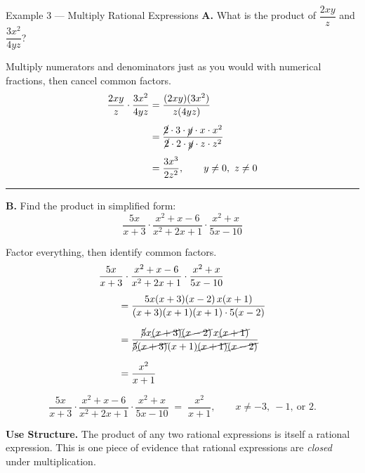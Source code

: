 \documentclass[11pt]{article}
\begin{document}
\begin{example}{Example 3 --- Multiply Rational Expressions}
\textbf{A.} What is the product of $\dfrac{2xy}{z}$ and $\dfrac{3x^{2}}{4yz}$?

\vspace{0.4em}
Multiply numerators and denominators just as you would with numerical fractions, then cancel common factors.
\begin{align*}
\dfrac{2xy}{z}\cdot \dfrac{3x^{2}}{4yz} &= \dfrac{(2xy)(3x^{2})}{z(4yz)} \\[4pt]
&= \dfrac{\cancel{2}\cdot 3 \cdot \cancel{y}\cdot x \cdot x^{2}}{\cancel{2}\cdot 2 \cdot \cancel{y}\cdot z \cdot z^{2}} \\[4pt]
&= \dfrac{3x^{3}}{2z^{2}}, \qquad y \neq 0,\ z \neq 0
\end{align*}

\vspace{0.5em}
\hrule
\vspace{0.5em}

\textbf{B.} Find the product in simplified form:
\[
\dfrac{5x}{x+3}\cdot \dfrac{x^{2}+x-6}{x^{2}+2x+1}\cdot \dfrac{x^{2}+x}{5x-10}
\]

\vspace{0.3em}
Factor everything, then identify common factors.
\begin{align*}
&\dfrac{5x}{x+3}\cdot \dfrac{x^{2}+x-6}{x^{2}+2x+1}\cdot \dfrac{x^{2}+x}{5x-10} \\[4pt]
&\qquad = \dfrac{5x(x+3)(x-2)\,x(x+1)}{(x+3)(x+1)(x+1)\cdot 5(x-2)} \\[6pt]
&\qquad = \dfrac{\cancel{5}x\cancel{(x+3)}\cancel{(x-2)}\,x\cancel{(x+1)}}{\cancel{5}\cancel{(x+3)}(x+1)\cancel{(x+1)}\cancel{(x-2)}} \\[6pt]
&\qquad = \dfrac{x^{2}}{x+1}
\end{align*}

\[
\dfrac{5x}{x+3}\cdot \dfrac{x^{2}+x-6}{x^{2}+2x+1}\cdot \dfrac{x^{2}+x}{5x-10} \;=\; \dfrac{x^{2}}{x+1}, \qquad x \neq -3,\ -1,\ \text{or } 2.
\]

\begin{annot}
\textbf{Use Structure.} The product of any two rational expressions is itself a rational expression. This is one piece of evidence that rational expressions are \emph{closed} under multiplication.
\end{annot}
\end{example}
\end{document}
